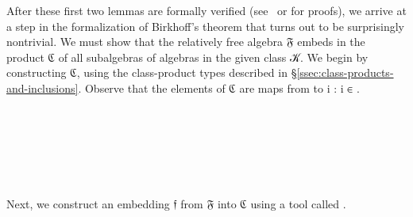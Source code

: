 \documentclass[a4paper,UKenglish,cleveref,autoref,thm-restate]{lipics-v2021}
\begin{document}
After these first two lemmas are formally verified (see~\cite{DeMeo:2021} or \ualibdotorg for proofs), we arrive at a step in the formalization of Birkhoff's theorem that turns out to be surprisingly nontrivial. We must show that the relatively free algebra \af 𝔉 embeds in the product \af ℭ of all subalgebras of algebras in the given class \ab 𝒦.  We begin by constructing \af ℭ, using the class-product types described in \S\ref{ssec:class-products-and-inclusions}. Observe that the elements of \af ℭ are maps from  to \as{\{} \ab i \as : \ab i \as ∈ \as{\}}.
\ccpad
\begin{code}%
\>[1]\AgdaSpace{}%
\AgdaSymbol{:}\AgdaSpace{}%
\AgdaSpace{}%
\AgdaSpace{}\<%
\\
%
\>[1]\AgdaSpace{}%
\AgdaSymbol{=}\AgdaSpace{}%
\AgdaSpace{}%
\AgdaSymbol{(}\AgdaSymbol{\{}\AgdaSymbol{\}\{}\AgdaSymbol{\}}\AgdaSpace{}%
\AgdaSymbol{)}\<%
\\
%
\>[1]\AgdaSpace{}%
\AgdaSymbol{:}\AgdaSpace{}%
\AgdaSpace{}%
\AgdaSpace{}%
\AgdaSpace{}%
\AgdaSpace{}%
\<%
\\
%
\>[1]\AgdaSpace{}%
\AgdaSymbol{=}\AgdaSpace{}%
\AgdaSpace{}%
\AgdaSymbol{(}\AgdaSpace{}%
\AgdaSymbol{:}\AgdaSpace{}%
\AgdaSymbol{)}\AgdaSpace{}%
\AgdaSpace{}%
\AgdaSpace{}%
\AgdaSpace{}%
\<%
\\
%
\>[1]\AgdaSpace{}%
\AgdaSymbol{:}\AgdaSpace{}%
\AgdaSpace{}%
\AgdaSpace{}%
\AgdaSpace{}\<%
\\
%
\>[1]\AgdaSpace{}%
\AgdaSymbol{=}\AgdaSpace{}%
\AgdaSpace{}%
\<%
\end{code}
\ccpad
Next, we construct an embedding \af 𝔣 from \af 𝔉 into \af ℭ using a \ualib tool called .
\ccpad
\end{document}
